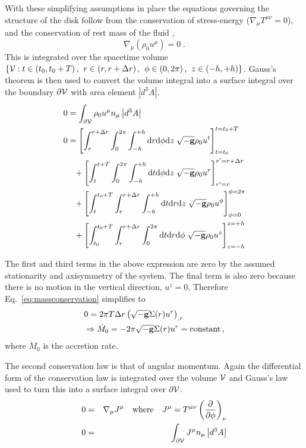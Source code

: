 With these simplifying assumptions in place the equations governing the structure of the disk follow from the conservation of stress-energy ($\nabla_{\mu}T^{\mu\nu}=0$), and the conservation of rest mass of the fluid \citep{MTW},
\begin{equation} \nabla_{\mu} \left( \rho_{0}u^{\mu} \right)=0  \; .\end{equation}
This is integrated over the spacetime volume $\left\{{\cal{V}}: t\in\left(t_{0},t_{0}+T\right), \right.\allowbreak\left. r\in\left(r,r+\Delta r\right), \right.\allowbreak\left. \phi\in\left(0,2\pi\right), \right.\allowbreak\left. z\in\left(-h,+h\right)\right\}$. Gauss's theorem is then used to convert the volume integral into a surface integral over the boundary $\partial{\cal{V}}$ with area element $\left|d^{3}A\right|$.
\begin{eqnarray} &0=\int_{\partial{\cal{V}}}\rho_{0}u^{\mu}n_{\mu}\left|d^{3}A\right| \\
& 0= \left[\int^{r+\Delta r}_{r}\int^{2\pi}_{0}\int^{+h}_{-h}\textrm{d}r\textrm{d}\phi\textrm{d}z\; \sqrt{-{\bf{g}}} \rho_{0}u^{t}  \right]^{t=t_{0}+T}_{t=t_{0}} \nonumber\\
&\quad\;+\left[ \int^{t+T}_{t}\int^{2\pi}_{0}\int^{+h}_{-h}\textrm{d}t\textrm{d}\phi\textrm{d}z\;  \sqrt{-{\bf{g}}}\rho_{0}u^{r}  \right]^{r'=r+\Delta r}_{r'=r} \nonumber \\
&\quad\; +\left[\int^{t_{0}+T}_{t}\int^{r+\Delta r}_{r}\int^{+h}_{-h}\textrm{d}t\textrm{d}r\textrm{d}z\; \sqrt{-{\bf{g}}}\rho_{0}u^{\phi}  \right]^{\phi=2\pi}_{\phi=0}\nonumber \\
&\quad\; +\left[\int^{t_{0}+T}_{t_{0}}\int^{r+\Delta r}_{r}\int^{2\pi}_{0}\textrm{d}t\textrm{d}r\textrm{d}\phi\; \sqrt{-{\bf{g}}}\rho_{0}u^{z} \right]^{z=+h}_{z=-h} \label{eq:massconservation}
\end{eqnarray}

The first and third terms in the above expression are zero by the assumed stationarity and axisymmetry of the system. The final term is also zero because there is no motion in the vertical direction, $u^{z}=0$. Therefore Eq.\ \ref{eq:massconservation} simplifies to
\begin{eqnarray}
&0=2\pi T\Delta r \left( \sqrt{-{\bf{g}}}\Sigma(r) u^{r}\right)_{,r} \nonumber\\
& \Rightarrow \dot{M}_{0}=-2\pi\sqrt{-{\bf{g}}} \Sigma(r) u^{r}=\textrm{constant} \, ,
\end{eqnarray}
where $\dot{M}_{0}$ is the accretion rate. 

The second conservation law is that of angular momentum. Again the differential form of the conservation law is integrated over the volume ${\cal{V}}$ and Gauss's law used to turn this into a surface integral over $\partial{\cal{V}}$.
\begin{eqnarray}
&0=&\nabla_{\mu}J^{\mu}\quad \textrm{where} \quad J^{\mu}=T^{\mu\nu}\left(\frac{\partial}{\partial\phi}\right)_{\nu}\nonumber\\
&0=&\int_{\partial{\cal{V}}}J^{\mu}n_{\mu} \left|d^{3}A\right|\nonumber \\
\end{eqnarray}

